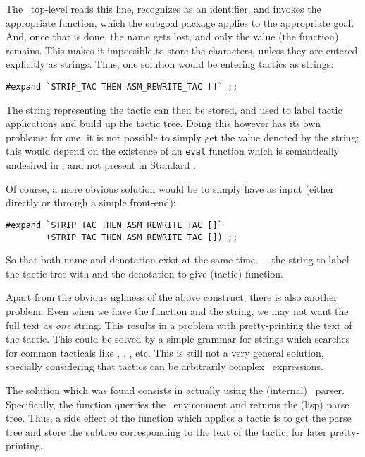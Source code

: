 The \ML\ top-level reads this line, recognizes  as an
identifier, and invokes the appropriate function, which the subgoal
package applies to the appropriate goal.  And, once that is done, the
name gets lost, and only the value (the function) remains. This makes
it impossible to store the characters, unless they are entered
explicitly as strings. Thus, one solution would be entering tactics as
strings:

\begin{verbatim}
#expand `STRIP_TAC THEN ASM_REWRITE_TAC []` ;;
\end{verbatim}

The string representing the tactic can then be stored, and used to
label tactic applications and build up the tactic tree. Doing this
however has its own problems: for one, it is not possible to simply
get the value denoted by the string; this would depend on the
existence of an {\tt eval} function which is semantically undesired in
\ML, and not present in Standard \ML.

Of course, a more obvious solution would be to simply have as input
(either directly or through a simple front-end):

\begin{verbatim}
#expand `STRIP_TAC THEN ASM_REWRITE_TAC []` 
        (STRIP_TAC THEN ASM_REWRITE_TAC []) ;;
\end{verbatim}

So that both name and denotation exist at the same time --- the string
to label the tactic tree with and the denotation to give (tactic)
function.

Apart from the obvious ugliness of the above construct, there is also
another problem. Even when we have the function and the 
string, we may not want the full text as {\em one} string. This
results in a problem with pretty-printing the text of the tactic.
This could be solved by a simple grammar for strings which searches
for common tacticals like , , , etc.
This is still not a very general solution, specially considering that
tactics can be arbitrarily complex \ML\ expressions.


The solution which was found consists in actually using the (internal)
\ML\ parser.  Specifically, the function 
querries the \ML\ environment and returns the (lisp) parse tree. Thus, a
side effect of the function which applies a tactic is to get the parse
tree and store the subtree corresponding to the text of the tactic,
for later pretty-printing.

